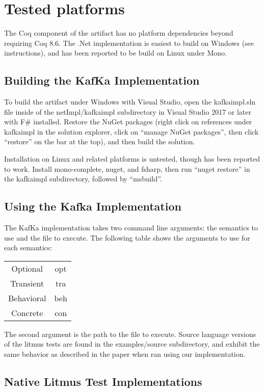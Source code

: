 \documentclass[a4paper,UKenglish]{darts-v2018}
\newenvironment{platforms}{\section{Tested platforms}}{}
\begin{document}
\begin{platforms}
The Coq component of the artifact has no platform dependencies beyond requiring Coq 8.6. 
The .Net implementation is easiest to build on Windows (see instructions), and has been
reported to be build on Linux under Mono.

\subsection{Building the KafKa Implementation} To build the artifact under Windows with Visual Studio, open the kafkaimpl.sln file inside of the netImpl/kafkaimpl subdirectory 
in Visual Studio 2017 or later with F\# installed. Restore the NuGet packages (right click on references under kafkaimpl in the solution explorer,
click on ``manage NuGet packages'', then click ``restore'' on the bar at the top), and then build the solution. 

Installation on Linux and related platforms is untested, though has been reported to work. Install mono-complete, nuget, and fsharp, then run
``nuget restore'' in the kafkaimpl subdirectory, followed by ``msbuild''.

\subsection{Using the Kafka Implementation}

The KafKa implementation takes two command line arguments: the semantics to use and the file to execute. The following table shows the
arguments to use for each semantics:

\begin{tabular}{cc}
Optional & opt \\
Transient & tra \\
Behavioral & beh \\
Concrete & con \\
\end{tabular}

The second argument is the path to the file to execute. Source language versions of the litmus tests are found in the
examples/source subdirectory, and exhibit the same behavior as described in the paper when ran using our implementation.

\subsection{Native Litmus Test Implementations}


\end{platforms}
\end{document}
